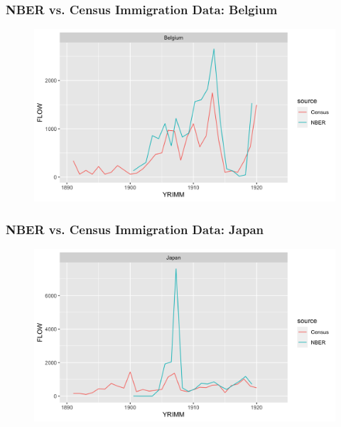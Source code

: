 \documentclass[pdf]{beamer}
\begin{document}
\begin{frame}[label = flow_compar_belgium]
	\frametitle{NBER vs. Census Immigration Data: Belgium}
    \centering
	\begin{figure}[H]
		\begin{center}
			\includegraphics[width=\textwidth]{../../figs/8aug23/nber_census_compare_belgium.png}
		\end{center}
	\end{figure}
    \hyperlink{data1}{}
\end{frame}


\begin{frame}[label = flow_compar_japan]
	\frametitle{NBER vs. Census Immigration Data: Japan}
    \centering
	\begin{figure}[H]
		\begin{center}
			\includegraphics[width=\textwidth]{../../figs/8aug23/nber_census_compare_japan.png}
		\end{center}
	\end{figure}
    \hyperlink{data1}{}
\end{frame}
\end{document}
